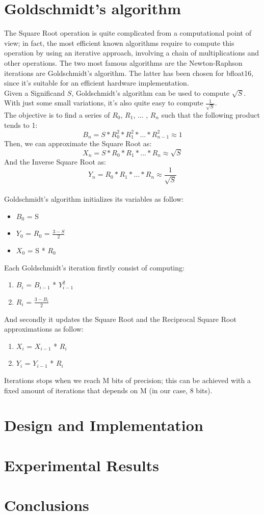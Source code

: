 \documentclass[12pt]{article}
\begin{document}
\section{Goldschmidt’s algorithm}
The Square Root operation is quite complicated from a computational point of view; in fact, the most efficient known algorithms require to compute this operation by using an iterative approach, involving a chain of multiplications and other operations. The two most famous algorithms are the Newton-Raphson iterations are Goldschmidt’s algorithm. The latter has been chosen for bfloat16, since it's suitable for an efficient hardware implementation. 
\\
Given a Significand $S$, Goldschmidt's algorithm can be used to compute $\sqrt{S}$. With just some small variations, it's also quite easy to compute $\frac{1}{\sqrt{S}}$.\\
The objective is to find a series of $R_0$, $R_1$, ... , $R_n$ such that the following product tends to 1:
$$B_n = S*R_0^{2}*R_1^{2}* ... * R_{n-1}^{2} \approx 1 $$
Then, we can approximate the Square Root as:
$$ X_{n} = S * R_0*R_1* ... * R_n \approx \sqrt{S} $$
And the Inverse Square Root as:
$$ Y_n =   R_0*R_1* ... * R_n \approx  \frac{1}{\sqrt{S}}$$
\\
Goldschmidt's algorithm initializes its variables as follow:

\begin{itemize}
\item $B_0$ = S
\item $Y_0$ = $R_0$ = $\frac{3-S}{2}$
\item $X_0$ = S * $R_0$
\end{itemize}

Each Goldschmidt's iteration firstly consist of computing:

\begin{enumerate}
\item $B_i$ = $B_{i-1}$ * $Y_{i-1}^{2}$
\item $R_i$ = $\frac{3-B_i}{2}$
\end{enumerate}

And secondly it updates the Square Root and the Reciprocal Square Root approximations as follow:
\begin{enumerate}
\item $X_i$ = $X_{i-1}$ * $R_i$
\item $Y_i$ = $Y_{i-1}$ * $R_i$
\end{enumerate}

Iterations stops when we reach M bits of precision; this can be achieved with a fixed amount of iterations that depends on M (in our case, 8 bits).
\section{Design and Implementation}

\section{Experimental Results}

\section{Conclusions}
\end{document}
